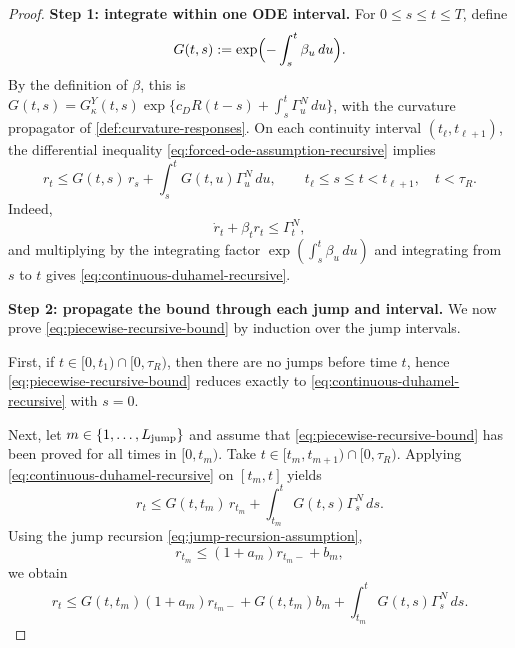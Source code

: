 \begin{proof}
\noindent\textbf{Step 1: integrate within one ODE interval.}
For $0\le s\le t\le T$, define
\[
G(t,s):=\exp\Bigl(-\int_s^t \beta_u\,du\Bigr).
\]
By the definition of $\beta$, this is
$G(t,s)=G_\kappa^Y(t,s)\exp\{c_DR(t-s)+\int_s^t\Gamma_u^N\,du\}$,
with the curvature propagator of \cref{def:curvature-responses}.
On each continuity interval $(t_\ell,t_{\ell+1})$, the differential inequality
\eqref{eq:forced-ode-assumption-recursive} implies
\begin{equation}
\label{eq:continuous-duhamel-recursive}
r_t
\le
G(t,s)\,r_s+\int_s^t G(t,u)\Gamma_u^N\,du,
\qquad
t_\ell\le s\le t<t_{\ell+1},
\quad t<\tau_R.
\end{equation}
Indeed,
\[
\dot r_t+\beta_t r_t\le \Gamma_t^N,
\]
and multiplying by the integrating factor
$\exp(\int_s^t\beta_u\,du)$ and integrating from $s$ to $t$
gives \eqref{eq:continuous-duhamel-recursive}.


\par\noindent\textbf{Step 2: propagate the bound through each jump and interval.}
We now prove \eqref{eq:piecewise-recursive-bound} by induction over the jump intervals.

First, if $t\in[0,t_1)\cap[0,\tau_R)$, then there are no jumps before time $t$, hence
\eqref{eq:piecewise-recursive-bound} reduces exactly to
\eqref{eq:continuous-duhamel-recursive} with $s=0$.

Next, let $m\in\{1,\dots,L_{\mathrm{jump}}\}$ and assume that
\eqref{eq:piecewise-recursive-bound} has been proved for all times in $[0,t_m)$.
Take $t\in[t_m,t_{m+1})\cap[0,\tau_R)$.
Applying \eqref{eq:continuous-duhamel-recursive} on $[t_m,t]$ yields
\begin{equation}
\label{eq:after-last-jump-recursive}
r_t
\le
G(t,t_m)\,r_{t_m}
+
\int_{t_m}^t G(t,s)\Gamma_s^N\,ds.
\end{equation}
Using the jump recursion \eqref{eq:jump-recursion-assumption},
\[
r_{t_m}\le (1+a_m)r_{t_m-}+b_m,
\]
we obtain
\begin{equation}
\label{eq:after-substitute-jump-recursive}
r_t
\le
G(t,t_m)(1+a_m)r_{t_m-}
+
G(t,t_m)b_m
+
\int_{t_m}^t G(t,s)\Gamma_s^N\,ds.
\end{equation}


\end{proof}
